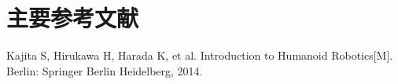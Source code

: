 
\section{主要参考文献}
\begin{thebibliography}{99}

 Kajita  S,  Hirukawa  H,  Harada  K,  et  al.  Introduction  to  Humanoid  Robotics[M].  Berlin:  Springer Berlin Heidelberg, 2014.

\end{thebibliography}
